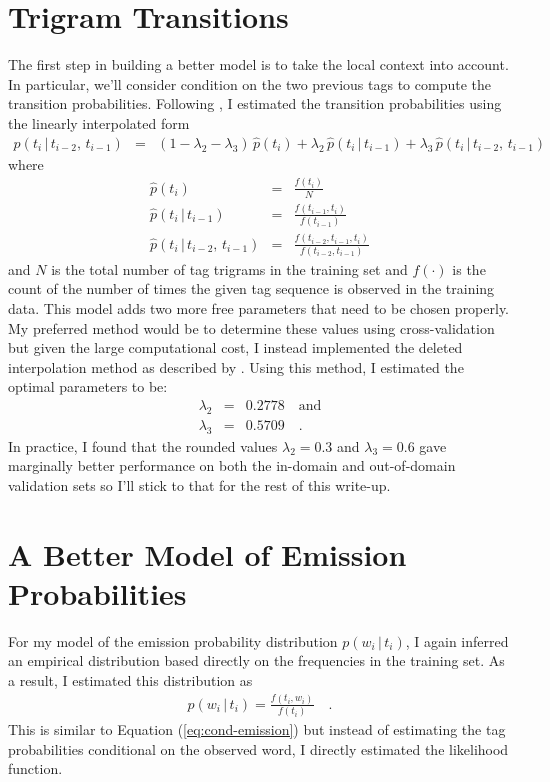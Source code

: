 \documentclass[11pt]{article}
\newcommand{\eq}[1]{Equation (\ref{eq:#1})}
\newcommand{\eqlabel}[1]{\label{eq:#1}}
\begin{document}
\section{Trigram Transitions}

The first step in building a better model is to take the local context into
account.
In particular, we'll consider condition on the two previous tags to compute
the transition probabilities.
Following \citet{tnt}, I estimated the transition probabilities using the
linearly interpolated form
\begin{eqnarray}\eqlabel{trigram}
p(t_i\,|\, t_{i-2},\,t_{i-1}) & = &
    (1-\lambda_2-\lambda_3)\,\hat{p}(t_i) +
    \lambda_2\,\hat{p}(t_i\,|\,t_{i-1}) +
    \lambda_3\,\hat{p}(t_i\,|\,t_{i-2},\,t_{i-1})
\end{eqnarray}
where
\begin{eqnarray}
\hat{p}(t_i) &=& \frac{f(t_i)}{N} \\
\hat{p}(t_i\,|\,t_{i-1}) &=& \frac{f(t_{i-1},t_i)}{f(t_{i-1})} \\
\hat{p}(t_i\,|\,t_{i-2},\,t_{i-1}) &=&
    \frac{f(t_{i-2},t_{i-1},t_i)}{f(t_{i-2},t_{i-1})}
\end{eqnarray}
and $N$ is the total number of tag trigrams in the training set and $f(\cdot)$
is the count of the number of times the given tag sequence is observed in
the training data.
This model adds two more free parameters that need to be chosen properly.
My preferred method would be to determine these values using cross-validation
but given the large computational cost, I instead implemented the deleted
interpolation method as described by \citet{tnt}.
Using this method, I estimated the optimal parameters to be:
\begin{eqnarray}
    \lambda_2 &=& 0.2778 \quad \mathrm{and} \nonumber\\
    \lambda_3 &=& 0.5709 \quad.
\end{eqnarray}
In practice, I found that the rounded values $\lambda_2 = 0.3$ and
$\lambda_3 = 0.6$ gave marginally better performance on both the in-domain
and out-of-domain validation sets so I'll stick to that for the rest of this
write-up.

\section{A Better Model of Emission Probabilities}

For my model of the emission probability distribution $p(w_i\,|\,t_i)$, I
again inferred an empirical distribution based directly on the frequencies in
the training set.
As a result, I estimated this distribution as
\begin{eqnarray}\eqlabel{emission}
p(w_i\,|\,t_i) = \frac{f(t_i,w_i)}{f(t_i)}\quad.
\end{eqnarray}
This is similar to \eq{cond-emission} but instead of estimating the tag
probabilities conditional on the observed word, I directly estimated the
likelihood function.
\end{document}
